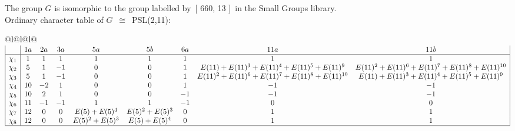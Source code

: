 \documentclass[varwidth=\maxdimen,border=10]{standalone}
\begin{document}
The group $G$ is isomorphic to the group labelled by\ [ 660, 13 ]\ in the Small Groups library.\\
Ordinary character table of $G$\ $\cong$\ PSL(2,11):\\
\begin{center}
\begin{tabular}{@{}l@{}l@{}l@{}}
\hline
\(\begin{array}{|l|cccccccc|}
  & 1a & 2a & 3a & 5a & 5b & 6a & 11a & 11b\\ \hline
\chi_{1} & 1 & 1 & 1 & 1 & 1 & 1 & 1 & 1\\
\chi_{2} & 5 & 1 & -1 & 0 & 0 & 1 & E(11)+E(11)^{3}+E(11)^{4}+E(11)^{5}+E(11)^{9} & E(11)^{2}+E(11)^{6}+E(11)^{7}+E(11)^{8}+E(11)^{10}\\
\chi_{3} & 5 & 1 & -1 & 0 & 0 & 1 & E(11)^{2}+E(11)^{6}+E(11)^{7}+E(11)^{8}+E(11)^{10} & E(11)+E(11)^{3}+E(11)^{4}+E(11)^{5}+E(11)^{9}\\
\chi_{4} & 10 & -2 & 1 & 0 & 0 & 1 & -1 & -1\\
\chi_{5} & 10 & 2 & 1 & 0 & 0 & -1 & -1 & -1\\
\chi_{6} & 11 & -1 & -1 & 1 & 1 & -1 & 0 & 0\\
\chi_{7} & 12 & 0 & 0 & E(5)+E(5)^{4} & E(5)^{2}+E(5)^{3} & 0 & 1 & 1\\
\chi_{8} & 12 & 0 & 0 & E(5)^{2}+E(5)^{3} & E(5)+E(5)^{4} & 0 & 1 & 1\\
\hline
\end{array}\)\\
\end{tabular}
\end{center}
\end{document}
